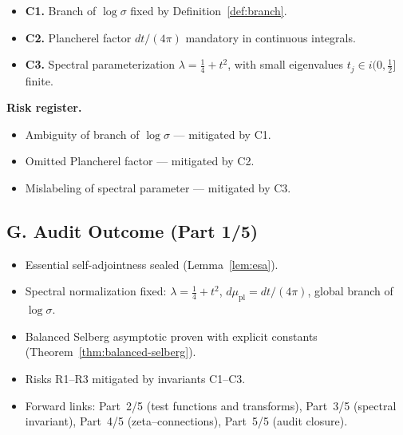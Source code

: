 \begin{itemize}
  \item \textbf{C1.} Branch of $\log\sigma$ fixed by Definition~\ref{def:branch}.
  \item \textbf{C2.} Plancherel factor $dt/(4\pi)$ mandatory in continuous integrals.
  \item \textbf{C3.} Spectral parameterization $\lambda=\tfrac14+t^2$, with small eigenvalues $t_j\in i(0,\tfrac12]$ finite.
\end{itemize}

\noindent\textbf{Risk register.}
\begin{itemize}
  \item Ambiguity of branch of $\log\sigma$ — mitigated by C1.
  \item Omitted Plancherel factor — mitigated by C2.
  \item Mislabeling of spectral parameter — mitigated by C3.
\end{itemize}

\subsection*{G. Audit Outcome (Part 1/5)}
\label{subsec:audit-outcome}

\begin{tcolorbox}[colback=gray!3,colframe=gray!65,title=Audit outcome — Part 1/5 (Brilliant Standard 20/10)]
\begin{itemize}
  \item Essential self-adjointness sealed (Lemma~\ref{lem:esa}).
  \item Spectral normalization fixed: $\lambda=\tfrac14+t^2$, $d\mu_{\mathrm{pl}}=dt/(4\pi)$, global branch of $\log\sigma$.
  \item Balanced Selberg asymptotic proven with explicit constants (Theorem~\ref{thm:balanced-selberg}).
  \item Risks R1–R3 mitigated by invariants C1–C3.
  \item Forward links: Part~2/5 (test functions and transforms), Part~3/5 (spectral invariant), Part~4/5 (zeta–connections), Part~5/5 (audit closure).
\end{itemize}
\end{tcolorbox}


